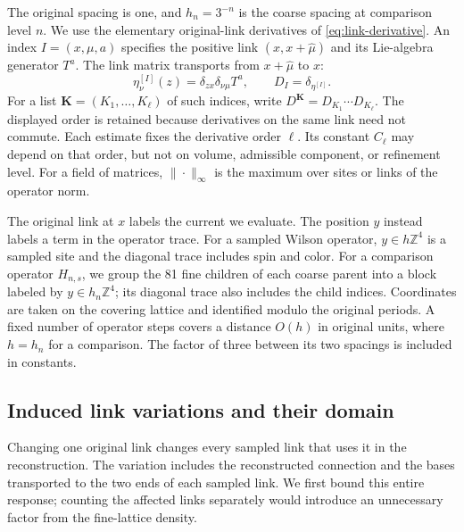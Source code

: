 \documentclass[11pt,a4paper]{article}
\theoremstyle{remark}
\begin{document}
The original spacing is one, and $h_n=3^{-n}$ is the coarse spacing
at comparison level $n$. We use the elementary original-link derivatives
of \eqref{eq:link-derivative}. An index $I=(x,\mu,a)$ specifies the
positive link $(x,x+\hat\mu)$ and its Lie-algebra generator $T^a$.
The link matrix transports from $x+\hat\mu$ to $x$:
\begin{equation}
 \eta^{[I]}_\nu(z)=\delta_{zx}\delta_{\nu\mu}T^a,
 \qquad D_I=\delta_{\eta^{[I]}}.
\end{equation}
For a list $\boldsymbol K=(K_1,\ldots,K_\ell)$ of such indices,
write $D^{\boldsymbol K}=D_{K_1}\cdots D_{K_\ell}$. The displayed
order is retained because derivatives on the same link need not commute.
Each estimate fixes the derivative order $\ell$. Its constant
$C_\ell$ may depend on that order, but not on volume, admissible
component, or refinement level. For a field of matrices,
$\|\cdot\|_\infty$ is the maximum over sites or links of the
operator norm.

The original link at $x$ labels the current we evaluate. The position
$y$ instead labels a term in the operator trace. For a sampled Wilson
operator, $y\in h\mathbb Z^4$ is a sampled site and the diagonal
trace includes spin and color. For a comparison operator $H_{n,s}$,
we group the 81 fine children of each coarse parent into a block labeled
by $y\in h_n\mathbb Z^4$; its diagonal trace also includes the child
indices. Coordinates are taken on the covering lattice and identified
modulo the original periods. A fixed number of operator steps covers
a distance $O(h)$ in original units, where $h=h_n$ for a comparison.
The factor of three between its two spacings is included in constants.

\subsection{Induced link variations and their domain}

Changing one original link changes every sampled link that uses it in
the reconstruction. The variation includes the reconstructed connection
and the bases transported to the two ends of each sampled link. We first
bound this entire response; counting the affected links separately
would introduce an unnecessary factor from the fine-lattice density.
\end{document}
